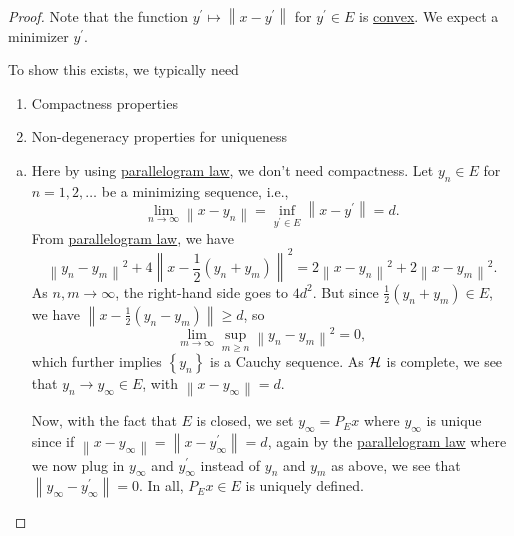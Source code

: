 \begin{proof}
	Note that the function \(y^\prime \mapsto \left\lVert x - y^\prime \right\rVert \) for \(y^\prime \in E\) is \hyperref[def:convex-function]{convex}. We expect a minimizer \(y^\prime \).

	\begin{note}
		To show this exists, we typically need
		\begin{enumerate}
			\item Compactness properties
			\item Non-degeneracy properties for uniqueness
		\end{enumerate}
	\end{note}

	\begin{enumerate}[(a)]
		\item Here by using \hyperref[lma:parallelogram-law]{parallelogram law}, we don't need compactness. Let \(y_n\in E\) for \(n = 1, 2, \ldots  \) be a minimizing sequence, i.e.,
		      \[
			      \lim\limits_{n \to \infty} \left\lVert x - y_n\right\rVert = \inf _{y^\prime \in E}\left\lVert x - y^\prime \right\rVert = d.
		      \]
		      From \hyperref[lma:parallelogram-law]{parallelogram law}, we have
		      \[
			      \left\lVert y_{n} - y_{m} \right\rVert^{2} + 4 \left\lVert x - \frac{1}{2}(y_{n} + y_{m} )\right\rVert ^{2} = 2\left\lVert x - y_{n} \right\rVert ^{2} + 2\left\lVert x- y_{m} \right\rVert ^{2}.
		      \]
		      As \(n, m\to \infty \), the right-hand side goes to \(4d^{2} \). But since \(\frac{1}{2}(y_{n} + y_{m} )\in E\), we have \(\left\lVert x - \frac{1}{2}(y_{n} - y_{m} )\right\rVert \geq d\), so
		      \[
			      \lim\limits_{m \to \infty} \sup _{m \geq n}\left\lVert y_{n} - y_{m} \right\rVert^{2} = 0,
		      \]
		      which further implies \(\left\{ y_{n}  \right\} \) is a Cauchy sequence. As \(\mathcal{\MakeUppercase{h}} \) is complete, we see that \(y_{n} \to y_{\infty }\in E\), with \(\left\lVert x - y_{\infty }\right\rVert=d \).

		      Now, with the fact that \(E\) is closed, we set \(y_\infty = P_E x\) where \(y_\infty \) is unique since if \(\left\lVert x - y_\infty \right\rVert = \left\lVert x - y^\prime _\infty \right\rVert = d \), again by the \hyperref[lma:parallelogram-law]{parallelogram law} where we now plug in \(y_\infty \) and \(y_\infty ^\prime \) instead of \(y_{n} \) and \(y_{m} \) as above, we see that \(\left\lVert y_\infty - y^\prime _\infty \right\rVert = 0\). In all, \(P_E x \in E\) is uniquely defined.


\end{enumerate}
\end{proof}
